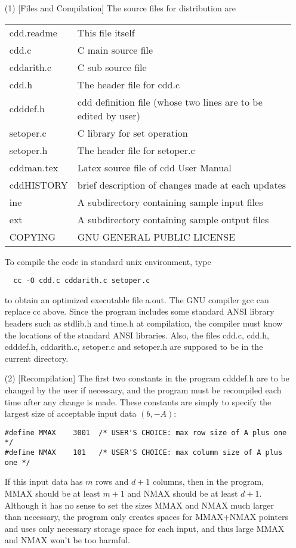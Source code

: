 \begin{itemize}
\item[(1)] [Files and Compilation] The source files for distribution are

\begin{tabular}{ll}
     cdd.readme  &   This file itself\\
     cdd.c       &   C main source file\\
     cddarith.c  &   C sub source file\\  
     cdd.h       &   The header file for cdd.c\\
     cdddef.h    &   cdd definition file (whose two lines are to be edited by user)\\
     setoper.c   &   C library for set operation\\
     setoper.h   &   The header file for setoper.c \\
     cddman.tex  &  Latex source file of cdd User Manual\\
     cddHISTORY  &   brief description of changes made at each updates\\
     ine         &   A subdirectory containing sample input files\\
     ext         &   A subdirectory containing sample output files\\
     COPYING     &   GNU GENERAL PUBLIC LICENSE
\end{tabular}

\noindent
To compile the code in standard unix environment, type
\begin{verbatim}
  cc -O cdd.c cddarith.c setoper.c
\end{verbatim}

to obtain an optimized executable file a.out. The GNU compiler
gcc can replace cc above.
Since the program includes some standard ANSI library 
headers such as stdlib.h and time.h at compilation, 
the compiler must know the locations of the standard ANSI libraries.
Also, the files cdd.c, cdd.h, cdddef.h, cddarith.c, setoper.c and setoper.h are supposed to be
in the current directory.

\item[(2)] [Recompilation] The first two constants in the program cdddef.h are to be 
changed by the user if necessary, and the program must be recompiled
each time after any change is made.   These constants are simply
to specify the largest size of acceptable input data $(b, -A)$: 
\begin{verbatim}
#define MMAX    3001  /* USER'S CHOICE: max row size of A plus one */
#define NMAX    101   /* USER'S CHOICE: max column size of A plus one */
\end{verbatim}
If this input data has $m$ rows and $d+1$ columns, then in the program,
MMAX should be at least $m+1$ and NMAX should be at least
$d+1$.  Although it has no sense to set the sizes MMAX and NMAX much larger
than necessary, the program only creates spaces for MMAX+NMAX pointers
and uses only necessary storage space for each input, and
thus large MMAX and NMAX won't be too harmful.


\end{itemize}
